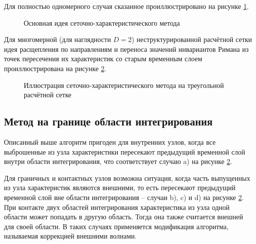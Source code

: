 Для полностью одномерного случая 
сказанное проиллюстрировано на рисунке \ref{pic:gcm-idea}.
\begin{figure}[H]
	\caption{Основная идея сеточно-характеристического метода}
	\label{pic:gcm-idea}
\end{figure}

Для многомерной (для наглядности $D = 2$) неструктурированной расчётной сетки 
идея расщепления по направлениям и переноса значений инвариантов Римана 
из точек пересечения их характеристик со старым временным слоем 
проиллюстрирована на рисунке \ref{pic:gcm-on-triangles}.
\begin{figure}[H]
	\caption{Иллюстрация сеточно-характеристического метода на треугольной расчётной сетке}
	\label{pic:gcm-on-triangles}
\end{figure}


\subsection{Метод на границе области интегрирования}
Описанный выше алгоритм пригоден для внутренних узлов, когда все выброшенные 
из узла характеристики пересекают предыдущий временной слой 
внутри области интегрирования, что соответствует случаю a) на рисунке \ref{pic:gcm-on-triangles}.

Для граничных и контактных узлов возможна ситуация, 
когда часть выпущенных из узла характеристик являются внешними, то есть
пересекают предыдущий временной слой вне области интегрирования -- 
случаи b), c) и d) на рисунке \ref{pic:gcm-on-triangles}.
При контакте двух областей интегрирования характеристика из узла
одной области может попадать в другую область. Тогда она также считается
внешней для своей области. В таких случаях применяется модификация алгоритма, 
называемая коррекцией внешними волнами. 

